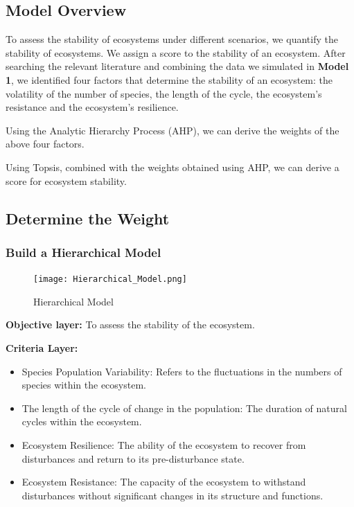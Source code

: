 \documentclass{mcmthesis}
\begin{document}
\subsection{Model Overview}
To assess the stability of ecosystems under different scenarios, we quantify the stability of ecosystems. We assign a score to the stability of an ecosystem. After searching the relevant literature and combining the data we simulated in \textbf{Model 1}, we identified four factors that determine the stability of an ecosystem: the volatility of the number of species, the length of the cycle, the ecosystem's resistance and the ecosystem's resilience. 

Using the Analytic Hierarchy Process (AHP), we can derive the weights of the above four factors. 

Using Topsis, combined with the weights obtained using AHP, we can derive a score for ecosystem stability. 

\subsection{Determine the Weight}
\subsubsection{Build a Hierarchical Model}

\begin{figure}[h]  %
\small
\centering  %
\texttt{[image: Hierarchical\_Model.png]}  %
\caption{Hierarchical Model} \label{fig:Hierarchical Model}  %
\end{figure}  %

\textbf{Objective layer:} To assess the stability of the ecosystem. 

\textbf{Criteria Layer:}
\begin{itemize}
    \item Species Population Variability: Refers to the fluctuations in the numbers of species within the ecosystem. 
    \item The length of the cycle of change in the population: The duration of natural cycles within the ecosystem.
    \item Ecosystem Resilience: The ability of the ecosystem to recover from disturbances and return to its pre-disturbance state. 
    \item Ecosystem Resistance: The capacity of the ecosystem to withstand disturbances without significant changes in its structure and functions. 
\end{itemize}
\end{document}
